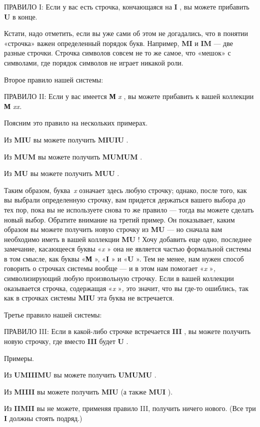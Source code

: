 ПРАВИЛО I: Если у вас есть строчка, кончающаяся на \textbf{I} , вы можете прибавить \textbf{U} в конце.

Кстати, надо отметить, если вы уже сами об этом не догадались, что в понятии «строчка» важен определенный порядок букв. Например, \textbf{MI} и \textbf{IM} --- две разные строчки. Строчка символов совсем не то же самое, что «мешок» с символами, где порядок символов не играет никакой роли.

Второе правило нашей системы:

ПРАВИЛО II: Если у вас имеется \textbf{М} \emph{x} , вы можете прибавить к вашей коллекции \textbf{М} \emph{xx.}

Поясним это правило на нескольких примерах.

Из \textbf{MIU} вы можете получить \textbf{MIUIU} .

Из \textbf{MUM} вы можете получить \textbf{MUMUM} .

Из \textbf{MU} вы можете получить \textbf{MUU} .

Таким образом, буква~\emph{x} означает здесь любую строчку; однако, после того, как вы выбрали определенную строчку, вам придется держаться вашего выбора до тех пор, пока вы не используете снова то же правило --- тогда вы можете сделать новый выбор. Обратите внимание на третий пример. Он показывает, каким образом вы можете получить новую строчку из \textbf{MU} --- но сначала вам необходимо иметь в вашей коллекции \textbf{MU} ! Хочу добавить еще одно, последнее замечание, касающееся буквы «\emph{x} » она не является частью формальной системы в том смысле, как буквы «\textbf{М} », «\textbf{I} » и «\textbf{U} ». Тем не менее, нам нужен способ говорить о строчках системы вообще --- и в этом нам помогает «\emph{x} »\emph{,} символизирующий любую произвольную строчку. Если в вашей коллекции оказывается строчка, содержащая «\emph{x} »\emph{,} это значит, что вы где-то ошиблись, так как в строчках системы \textbf{MIU} эта буква не встречается.

Третье правило нашей системы:

ПРАВИЛО III: Если в какой-либо строчке встречается \textbf{III} , вы можете получить новую строчку, где вместо \textbf{III} будет \textbf{U} .

Примеры.

Из \textbf{UMIIIMU} вы можете получить \textbf{UMUMU} .

Из \textbf{MIIII} вы можете получить \textbf{MIU} (а также \textbf{MUI} ).

Из \textbf{IIMII} вы не можете, применяя правило III, получить ничего нового. (Все три \textbf{I} должны стоять подряд.)

